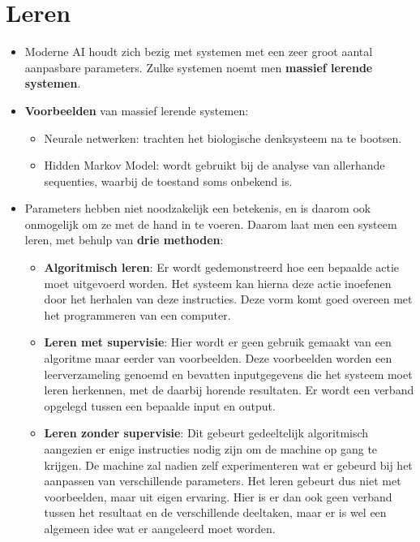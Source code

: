\section{Leren}
\begin{itemize}
	\item Moderne AI houdt zich bezig met systemen met een zeer groot aantal aanpasbare parameters. Zulke systemen noemt men \textbf{massief lerende systemen}.
	\item \textbf{Voorbeelden} van massief lerende systemen:
	\begin{itemize}
		\item Neurale netwerken: trachten het biologische denksysteem na te bootsen.
		\item Hidden Markov Model: wordt gebruikt bij de analyse van allerhande sequenties, waarbij de toestand soms onbekend is.
	\end{itemize}
	\item Parameters hebben niet noodzakelijk een betekenis, en is daarom ook onmogelijk om ze met de hand in te voeren. Daarom laat men een systeem leren, met behulp van \textbf{drie methoden}:
	\begin{itemize}
		\item \textbf{Algoritmisch leren}: Er wordt gedemonstreerd hoe een bepaalde actie moet uitgevoerd worden. Het systeem kan hierna deze actie inoefenen door het herhalen van deze instructies. Deze vorm komt goed overeen met het programmeren van een computer.
		\item \textbf{Leren met supervisie}: Hier wordt er geen gebruik gemaakt van een algoritme maar eerder van voorbeelden. Deze voorbeelden worden een leerverzameling genoemd en bevatten inputgegevens die het systeem moet leren herkennen, met de daarbij horende resultaten. Er wordt een verband opgelegd tussen een bepaalde input en output.
		\item \textbf{Leren zonder supervisie}: Dit gebeurt gedeeltelijk algoritmisch aangezien er enige instructies nodig zijn om de machine op gang te krijgen. De machine zal nadien zelf experimenteren wat er gebeurd bij het aanpassen van verschillende parameters. Het leren gebeurt dus niet met voorbeelden, maar uit eigen ervaring. Hier is er dan ook geen verband tussen het resultaat en de verschillende deeltaken, maar er is wel een algemeen idee wat er aangeleerd moet worden.
	\end{itemize}
\end{itemize}
